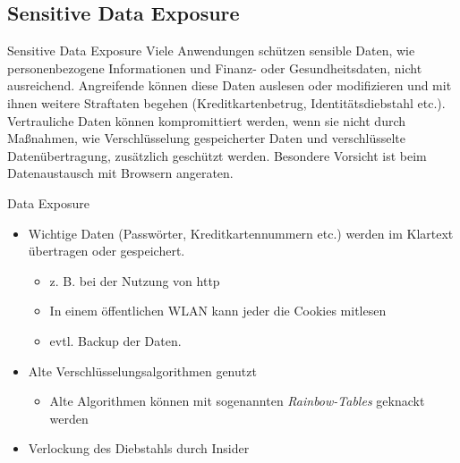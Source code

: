 \subsection{Sensitive Data Exposure}

\begin{defi}{Sensitive Data Exposure}
    Viele Anwendungen schützen sensible Daten, wie personenbezogene Informationen und Finanz- oder Gesundheitsdaten, nicht ausreichend.
    Angreifende können diese Daten auslesen oder modifizieren und mit ihnen weitere Straftaten begehen (Kreditkartenbetrug, Identitätsdiebstahl etc.).
    Vertrauliche Daten können kompromittiert werden, wenn sie nicht durch Maßnahmen, wie Verschlüsselung gespeicherter Daten und verschlüsselte Datenübertragung, zusätzlich geschützt werden.
    Besondere Vorsicht ist beim Datenaustausch mit Browsern angeraten.
\end{defi}

\begin{example}{Data Exposure}
    \begin{itemize}
        \item Wichtige Daten (Passwörter, Kreditkartennummern etc.) werden im Klartext übertragen oder gespeichert.
              \begin{itemize}
                  \item z. B. bei der Nutzung von http
                  \item In einem öffentlichen WLAN kann jeder die Cookies mitlesen
                  \item evtl. Backup der Daten.
              \end{itemize}
        \item Alte Verschlüsselungsalgorithmen genutzt
              \begin{itemize}
                  \item Alte Algorithmen können mit sogenannten \emph{Rainbow-Tables} geknackt werden
              \end{itemize}
        \item Verlockung des Diebstahls durch Insider
    \end{itemize}
\end{example}


